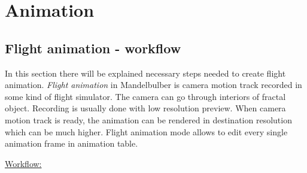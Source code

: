 \section{Animation}\label{animation}

\subsection{Flight animation - workflow}\label{flight-animation}

In this section there will be explained necessary steps needed to create flight animation. \emph{Flight animation} in Mandelbulber is camera motion track recorded in some kind of flight simulator. The camera can go through interiors of fractal object.
Recording is usually done with low resolution preview. When camera motion track is ready, the animation can be rendered in destination resolution which can be much higher.
Flight animation mode allows to edit every single animation frame in animation table.

\underline{Workflow:}

